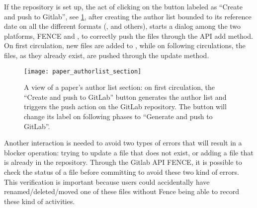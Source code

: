 If the repository is set up, the act of clicking on the button labeled as “Create and push to Gitlab”, see \cref{fig:paper_authorlist_section}, after creating the author list bounded to its reference date on all the different formats (,  and others), starts a dialog among the two platforms, FENCE and \gitlab, to correctly push the files through the \gitlab API add method.
On first circulation, new files are added to \gitlab, while on following circulations, the files, as they already exist, are pushed through the update method.

\begin{figure}[htb]
  \centering
  \texttt{[image: paper\_authorlist\_section]}
  \caption{A view of a paper's author list section: on first circulation,
  the \enquote{Create and push to GitLab} button generates the author list and triggers the push action on the GitLab repository.
  The button will change its label on following phases to \enquote{Generate and push to GitLab}.}%
  \label{fig:paper_authorlist_section}
\end{figure}

Another interaction is needed to avoid two types of errors that will result in a blocker operation: trying to update a file that does not exist, or adding a file that is already in the repository. Through the Gitlab API FENCE, it is possible to check the status of a file before committing to avoid these two kind of errors. This verification is important because users could accidentally have renamed/deleted/moved one of these files without Fence being able to record these kind of activities.